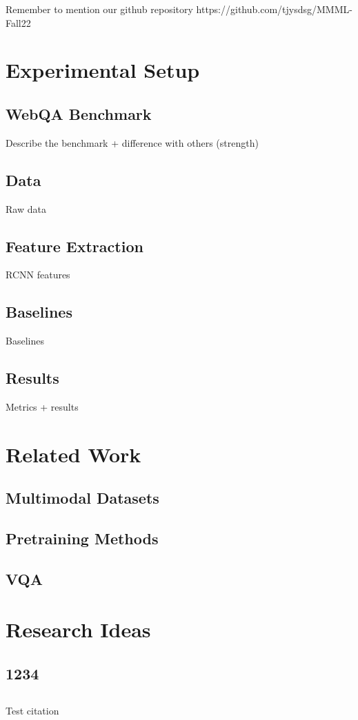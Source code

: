 \documentclass[nohyperref]{article}
\theoremstyle{plain}
\theoremstyle{definition}
\theoremstyle{remark}
\begin{document}
    Remember to mention our github repository https://github.com/tjysdsg/MMML-Fall22


    \section{Experimental Setup}

    \subsection{WebQA Benchmark}

    Describe the benchmark + difference with others (strength)

    \subsection{Data}

    Raw data

    \subsection{Feature Extraction}

    RCNN features

    \subsection{Baselines}

    Baselines

    \subsection{Results}

    Metrics + results


    \section{Related Work}

    \subsection{Multimodal Datasets}

    \subsection{Pretraining Methods}

    \subsection{VQA}


    \section{Research Ideas}

    \subsection{1234}

    \subsection{}

    Test citation \cite{mitchell80}

    
    
\end{document}
